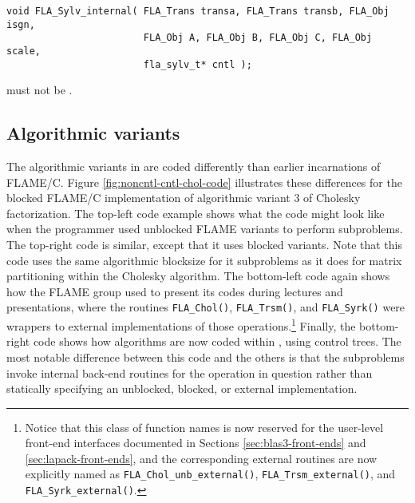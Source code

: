 
\begin{flaspec}
\begin{verbatim}
void FLA_Sylv_internal( FLA_Trans transa, FLA_Trans transb, FLA_Obj isgn,
                        FLA_Obj A, FLA_Obj B, FLA_Obj C, FLA_Obj scale,
                        fla_sylv_t* cntl );
\end{verbatim}
\begin{checks}
\checkitem
\cntl must not be \fnullns.
% 
\end{checks}
\end{flaspec}













\subsection{Algorithmic variants}

The algorithmic variants in \libflame are coded differently than earlier
incarnations of FLAME/C. 
Figure \ref{fig:noncntl-cntl-chol-code} illustrates these differences
for the blocked FLAME/C implementation of algorithmic variant 3 of
Cholesky factorization.
The top-left code example shows what the code might look like when
the programmer used unblocked FLAME variants to perform subproblems.
The top-right code is similar, except that it uses blocked variants.
Note that this code uses the same algorithmic blocksize for it subproblems
as it does for matrix partitioning within the Cholesky algorithm.
The bottom-left code again shows how the FLAME group used to present
its codes during lectures and presentations, where the routines
{\tt FLA\_Chol()}, {\tt FLA\_Trsm()}, and {\tt FLA\_Syrk()} were
wrappers to external implementations of those operations.\footnote{
Notice that this class of function names is now reserved for the user-level
front-end interfaces documented in Sections \ref{sec:blas3-front-ends} and
\ref{sec:lapack-front-ends}, and the corresponding external routines are now
explicitly named as {\tt FLA\_Chol\_unb\_external()},
{\tt FLA\_Trsm\_external()}, and {\tt FLA\_Syrk\_external()}.
}
Finally, the bottom-right code shows how algorithms are now coded within
\libflamens, using control trees.
The most notable difference between this code and the others is
that the subproblems invoke internal back-end routines for the
operation in question rather than statically specifying an unblocked,
blocked, or external implementation.

